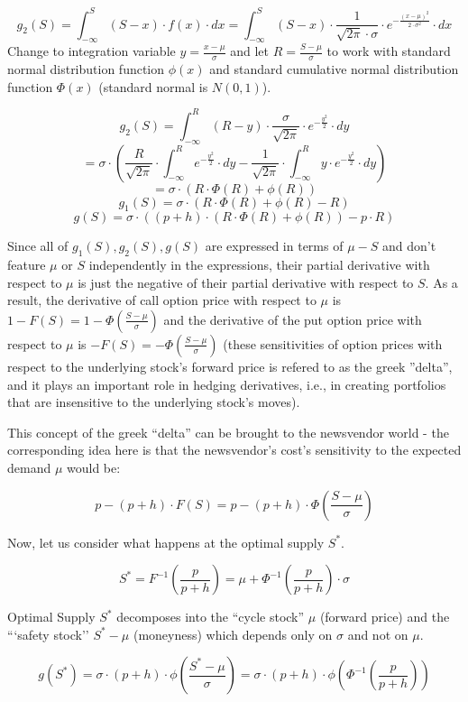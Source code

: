 \documentclass[11pt, oneside]{article}   	%
\begin{document}
$$g_2(S) = \int_{-\infty}^S (S - x) \cdot f(x) \cdot dx = \int_{-\infty}^S (S-x) \cdot \frac {1} {\sqrt{2 \pi} \cdot \sigma} \cdot e^{- \frac {(x - \mu)^2} {2 \cdot \sigma^2}} \cdot dx$$
Change to integration variable $y = \frac {x - \mu} {\sigma}$ and let $R = \frac {S - \mu} {\sigma}$ to work with standard normal distribution function $\phi(x)$ and standard cumulative normal distribution function $\Phi(x)$ (standard normal is $N(0, 1)$).

$$g_2(S) = \int_{-\infty}^R (R - y) \cdot \frac {\sigma} {\sqrt{2 \pi}} \cdot e^{- \frac {y^2} 2} \cdot dy$$
$$ = \sigma \cdot (\frac {R} {\sqrt{2 \pi}} \cdot \int_{-\infty}^R e^{- \frac {y^2} 2} \cdot dy - \frac 1 {\sqrt{2 \pi}} \cdot \int_{-\infty}^R y \cdot e^{- \frac {y^2} 2} \cdot dy)$$
$$ = \sigma \cdot (R \cdot \Phi(R) + \phi(R))$$
$$g_1(S) = \sigma \cdot (R \cdot \Phi(R) + \phi(R) - R)$$
$$g(S) = \sigma \cdot ((p + h) \cdot (R \cdot \Phi(R) + \phi(R)) - p \cdot R)$$

Since all of $g_1(S), g_2(S), g(S)$ are expressed in terms of $\mu - S$ and don't feature $\mu$ or $S$ independently in the expressions, their partial derivative with respect to $\mu$ is just the negative of their partial derivative with respect to $S$. As a result, the derivative of call option price with respect to $\mu$ is $1 - F(S) = 1 - \Phi(\frac {S - \mu} {\sigma})$ and the derivative of the put option price with respect to $\mu$ is $-F(S) = - \Phi(\frac {S - \mu} \sigma)$ (these sensitivities of option prices with respect to the underlying stock's forward price is refered to as the greek ''delta'', and it plays an important role in hedging derivatives, i.e., in creating portfolios that are insensitive to the underlying stock's moves).

This concept of the greek ``delta'' can be brought to the newsvendor world - the corresponding idea here is that the newsvendor's cost's sensitivity to the expected demand $\mu$ would be:

$$p - (p + h) \cdot F(S) = p - (p + h) \cdot \Phi(\frac {S - \mu} \sigma)$$

Now, let us consider what happens at the optimal supply $S^*$.

$$S^* = F^{-1} (\frac p {p + h}) = \mu + \Phi^{-1} (\frac p {p + h}) \cdot \sigma$$

Optimal Supply $S^*$ decomposes into the ``cycle stock'' $\mu$ (forward price) and the ```safety stock'' $S^* - \mu$ (moneyness) which depends only on $\sigma$ and not on $\mu$.

$$g(S^*) = \sigma \cdot (p + h) \cdot \phi(\frac {S^* - \mu} \sigma) = \sigma \cdot (p + h) \cdot \phi(\Phi^{-1}(\frac p {p + h})) $$ 
\end{document}
